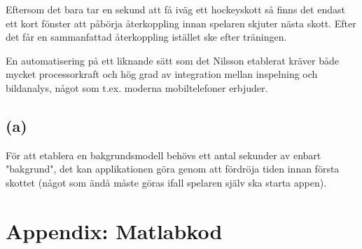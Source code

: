\documentclass[a4paper,12pt]{report}
\begin{document}
Eftersom det bara tar en sekund att få iväg ett hockeyskott så finns det
endast ett kort fönster att påbörja återkoppling innan spelaren skjuter nästa
skott. Efter det får en sammanfattad återkoppling istället ske efter
träningen.

En automatisering på ett liknande sätt som det Nilsson etablerat
kräver både mycket processorkraft och hög grad av integration mellan
inspelning och bildanalys, något som t.ex. moderna mobiltelefoner erbjuder.


\subsection{(a)}\label{sec:part1a}

\begin{figure}
\end{figure}





För att etablera en bakgrundsmodell behövs ett antal sekunder av enbart
"bakgrund", det kan applikationen göra genom att fördröja tiden innan första
skottet (något som ändå måste göras ifall spelaren själv ska starta appen).





\pagebreak
\section{Appendix: Matlabkod}

\printbibliography{}
\end{document}
